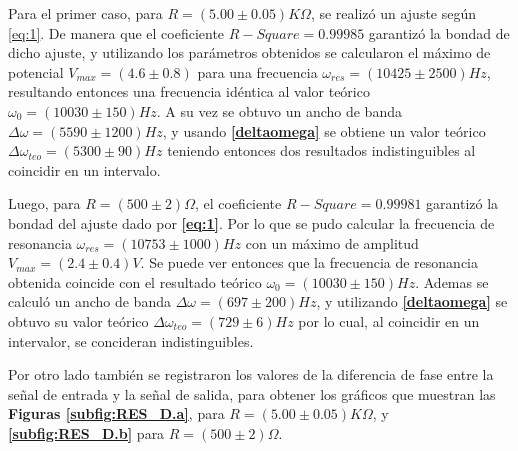 \documentclass[11pt,a4paper]{article}
\begin{document}
Para el primer caso, para $R=(5.00 \pm 0.05)K\Omega$, se realizó un ajuste según \eqref{eq:1}. De manera que el coeficiente $R-Square = 0.99985$ garantizó la bondad de dicho ajuste, y utilizando los parámetros obtenidos se calcularon el máximo de potencial $V_{max}=(4.6 \pm 0.8)$ para una frecuencia $\omega_{res} = (10425 \pm 2500)Hz$, resultando entonces una frecuencia idéntica al valor teórico $\omega_0 = (10030 \pm 150)Hz$. A su vez se obtuvo un ancho de banda $\Delta\omega = (5590 \pm 1200) Hz$, y usando \textbf{\eqref{deltaomega}} se obtiene un valor teórico $\Delta\omega_{teo} = (5300 \pm 90)Hz$ teniendo entonces dos resultados indistinguibles al coincidir en un intervalo. 


Luego, para $R=(500 \pm 2)\Omega$, el coeficiente $R-Square = 0.99981$ garantizó la bondad del ajuste dado por \textbf{\eqref{eq:1}}. Por lo que se pudo calcular la frecuencia de resonancia $\omega_{res}= (10753 \pm 1000) Hz$ con un máximo de amplitud $V_{max}=(2.4 \pm 0.4) V$. Se puede ver entonces que la frecuencia de resonancia obtenida coincide con el resultado teórico $\omega_0 = (10030 \pm 150) Hz$. Ademas se calculó un ancho de banda $\Delta\omega = (697 \pm 200)Hz$, y utilizando \textbf{\eqref{deltaomega}} se obtuvo su valor teórico $\Delta\omega_{teo} = (729 \pm 6) Hz$ por lo cual, al coincidir en un intervalor, se concideran indistinguibles.

Por otro lado también se registraron los valores de la diferencia de fase entre la señal de entrada y la señal de salida, para obtener los gráficos que muestran las \textbf{Figuras \ref{subfig:RES_D.a}}, para $R=(5.00 \pm 0.05) K\Omega$, y \textbf{\ref{subfig:RES_D.b}} para $R=(500 \pm 2)\Omega$.
\end{document}
